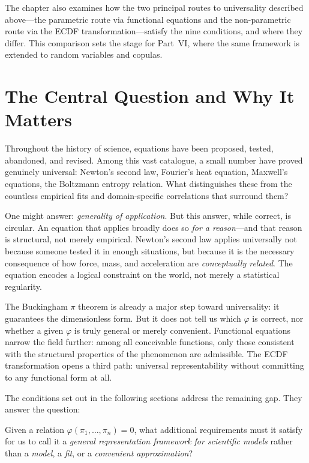 The chapter also examines how the two principal routes to
universality described above---the parametric route via functional
equations and the non-parametric route via the ECDF
transformation---satisfy the nine conditions, and where they
differ.  This comparison sets the stage for Part~VI, where the
same framework is extended to random variables and copulas.

\section{The Central Question and Why It Matters}
\label{sec:ucq:question}

Throughout the history of science, equations have been proposed,
tested, abandoned, and revised.  Among this vast catalogue, a small
number have proved genuinely universal: Newton's second law,
Fourier's heat equation, Maxwell's equations, the Boltzmann entropy
relation.  What distinguishes these from the countless empirical
fits and domain-specific correlations that surround them?

One might answer: \emph{generality of application}.  But this
answer, while correct, is circular.  An equation that applies
broadly does so \emph{for a reason}---and that reason is
structural, not merely empirical.  Newton's second law applies
universally not because someone tested it in enough situations, but
because it is the necessary consequence of how force, mass, and
acceleration are \emph{conceptually related}.  The equation encodes
a logical constraint on the world, not merely a statistical
regularity.

The Buckingham $\pi$ theorem is already a major step toward
universality: it guarantees the dimensionless form.  But it does
not tell us which $\varphi$ is correct, nor whether a given
$\varphi$ is truly general or merely convenient.  Functional
equations narrow the field further: among all conceivable
functions, only those consistent with the structural properties of
the phenomenon are admissible.  The ECDF transformation opens a
third path: universal representability without committing to any
functional form at all.

The conditions set out in the following sections address the
remaining gap.  They answer the question:


Given a relation $\varphi(\pi_1,\ldots,\pi_n)=0$, what additional
requirements must it satisfy for us to call it a
\emph{general representation framework for scientific models} rather than a \emph{model}, a
\emph{fit}, or a \emph{convenient approximation}?

